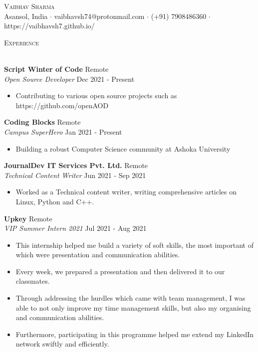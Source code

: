 \documentclass[a4paper]{article}
\newcommand{\lineunder} {
    \vspace*{-8pt} \\
    \hspace*{-18pt} \hrulefill \\
}
\newcommand{\header} [1] {
    {\hspace*{-18pt}\vspace*{6pt} \textsc{#1}}
    \vspace*{-6pt} \lineunder
}
\begin{document}
\vspace*{-40pt}

    

\vspace*{-10pt}
\begin{center}
	{\Huge \scshape {Vaibhav Sharma}}\\
	Asansol, India $\cdot$ vaibhavsh74@protonmail.com $\cdot$ (+91) 7908486360 $\cdot$ https://vaibhavsh7.github.io/\\
\end{center}

\header{Experience}
\vspace{1mm}

\textbf{Script Winter of Code} \hfill Remote\\
\textit{Open Source Developer} \hfill Dec 2021 - Present\\
\vspace{-1mm}
\begin{itemize} \itemsep 1pt
	\item Contributing to various open source projects such as https://github.com/openAOD
\end{itemize}
\textbf{Coding Blocks} \hfill Remote\\
\textit{Campus SuperHero} \hfill Jan 2021 - Present\\
\vspace{-1mm}
\begin{itemize} \itemsep 1pt
	\item Building a robust Computer Science community at Ashoka University
\end{itemize}
\textbf{JournalDev IT Services Pvt. Ltd.} \hfill Remote\\
\textit{Technical Content Writer} \hfill Jun 2021 - Sep 2021\\
\vspace{-1mm}
\begin{itemize} \itemsep 1pt
	\item Worked as a Technical content writer, writing comprehensive articles on Linux, Python and C++.
\end{itemize}
\textbf{Upkey} \hfill Remote\\
\textit{VIP Summer Intern 2021} \hfill Jul 2021 - Aug 2021\\
\vspace{-1mm}
\begin{itemize} \itemsep 1pt
	\item This internship helped me build a variety of soft skills, the most important of which were presentation and communication abilities.
	\item Every week, we prepared a presentation and then delivered it to our classmates.
	\item Through addressing the hurdles which came with team management, I was able to not only improve my time management skills, but also my organising and communication abilities.
	\item Furthermore, participating in this programme helped me extend my LinkedIn network swiftly and efficiently.
\end{itemize}
\end{document}
